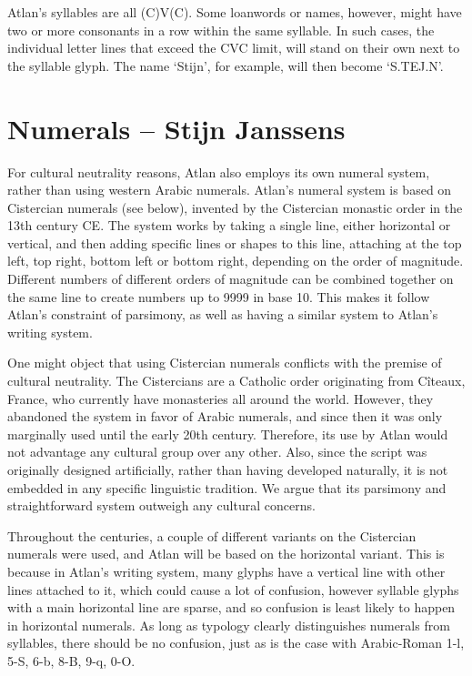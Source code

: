 Atlan’s syllables are all (C)V(C). Some loanwords or names, however, might have two or more consonants in a row within the same syllable. In such cases, the individual letter lines that exceed the CVC limit, will stand on their own next to the syllable glyph. The name ‘Stijn’, for example, will then become ‘S.TEJ.N’. 

\section{Numerals -- {\small Stijn Janssens}}

For cultural neutrality reasons, Atlan also employs its own numeral system, rather than using western Arabic numerals. Atlan’s numeral system is based on Cistercian numerals (see below), invented by the Cistercian monastic order in the 13th century CE. The system works by taking a single line, either horizontal or vertical, and then adding specific lines or shapes to this line, attaching at the top left, top right, bottom left or bottom right, depending on the order of magnitude. Different numbers of different orders of magnitude can be combined together on the same line to create numbers up to 9999 in base 10. This makes it follow Atlan’s constraint of parsimony, as well as having a similar system to Atlan’s writing system. 

One might object that using Cistercian numerals conflicts with the premise of cultural neutrality. The Cistercians are a Catholic order originating from Cîteaux, France, who currently have monasteries all around the world. However, they abandoned the system in favor of Arabic numerals,  and since then it was only marginally used until the early 20th century. Therefore, its use by Atlan would not advantage any cultural group over any other. Also, since the script was originally designed artificially, rather than having developed naturally, it is not embedded in any specific linguistic tradition. We argue that its parsimony and straightforward system outweigh any cultural concerns. 

Throughout the centuries, a couple of different variants on the Cistercian numerals were used, and Atlan will be based on the  horizontal variant. This is because in Atlan’s writing system, many glyphs have a vertical line with other lines attached to it, which could cause a lot of confusion, however syllable glyphs with a main horizontal line are sparse, and so confusion is least likely to happen in horizontal numerals. As long as typology clearly distinguishes numerals from syllables, there should be no confusion, just as is the case with Arabic-Roman 1-l, 5-S, 6-b, 8-B, 9-q, 0-O.  

